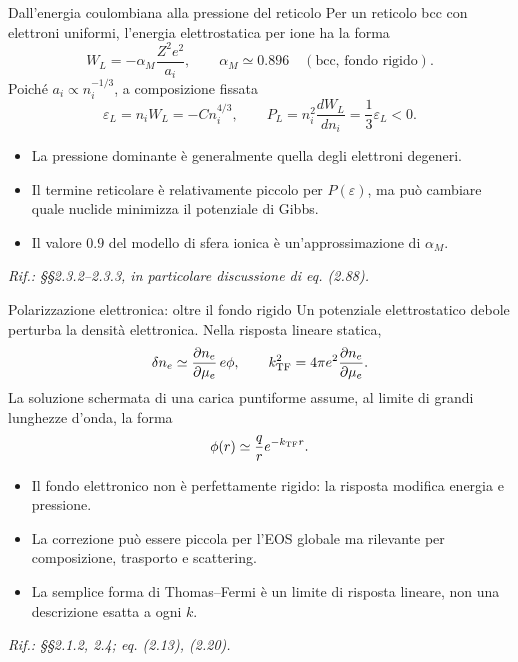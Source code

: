 \begin{frame}[t]{Dall'energia coulombiana alla pressione del reticolo}
\small
Per un reticolo bcc con elettroni uniformi, l'energia elettrostatica per ione ha la forma
\[
 W_L=-\alpha_M\frac{Z^2e^2}{a_i},\qquad \alpha_M\simeq0.896\quad
 (\text{bcc, fondo rigido}).
\]
Poiché $a_i\propto n_i^{-1/3}$, a composizione fissata
\[
 \varepsilon_L=n_iW_L=-C n_i^{4/3},\qquad
 P_L=n_i^2\frac{dW_L}{dn_i}=\frac13\varepsilon_L<0.
\]
\begin{itemize}
\item La pressione dominante è generalmente quella degli elettroni degeneri.
\item Il termine reticolare è relativamente piccolo per $P(\varepsilon)$, ma può cambiare quale nuclide minimizza il potenziale di Gibbs.
\item Il valore $0.9$ del modello di sfera ionica è un'approssimazione di $\alpha_M$.
\end{itemize}
\par\scriptsize\emph{Rif.: §§2.3.2--2.3.3, in particolare discussione di eq. (2.88).}
\end{frame}

\begin{frame}[t]{Polarizzazione elettronica: oltre il fondo rigido}
\small
Un potenziale elettrostatico debole perturba la densità elettronica. Nella risposta lineare statica,
\[
 \delta n_e\simeq\frac{\partial n_e}{\partial\mu_e}\,e\phi,\qquad
 k_{\rm TF}^2=4\pi e^2\frac{\partial n_e}{\partial\mu_e}.
\]
La soluzione schermata di una carica puntiforme assume, al limite di grandi lunghezze d'onda, la forma
\[
 \phi(r)\simeq\frac{q}{r}e^{-k_{\rm TF}r}.
\]
\begin{itemize}
\item Il fondo elettronico non è perfettamente rigido: la risposta modifica energia e pressione.
\item La correzione può essere piccola per l'EOS globale ma rilevante per composizione, trasporto e scattering.
\item La semplice forma di Thomas--Fermi è un limite di risposta lineare, non una descrizione esatta a ogni $k$.
\end{itemize}
\par\scriptsize\emph{Rif.: §§2.1.2, 2.4; eq. (2.13), (2.20).}
\end{frame}

